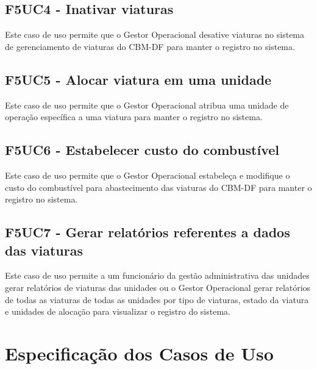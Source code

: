   \subsection{F5UC4 - Inativar viaturas}
Este caso de uso permite que o Gestor Operacional desative viaturas no sistema de gerenciamento de viaturas do CBM-DF para manter o registro no sistema.
  \subsection{F5UC5 - Alocar viatura em uma unidade}
Este caso de uso permite que o Gestor Operacional atribua uma unidade de operação específica a uma viatura para manter o registro no sistema.
  \subsection{F5UC6 - Estabelecer custo do combustível}
Este caso de uso permite que o Gestor Operacional estabeleça e modifique o custo do combustível para abastecimento das viaturas do CBM-DF para manter o registro no sistema.
  \subsection{F5UC7 - Gerar relatórios referentes a dados das viaturas}
Este caso de uso permite a um funcionário da gestão administrativa das unidades gerar relatórios de viaturas das unidades ou o Gestor Operacional gerar relatórios de todas as viaturas de todas as unidades por tipo de viaturas, estado da viatura e unidades de alocação para visualizar o registro do sistema.

 \section{Especificação dos Casos de Uso}
 
  
 